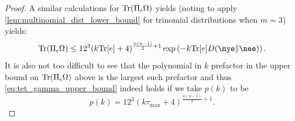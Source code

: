 \documentclass[notitlepage, 10pt]{article}
\begin{document}
\begin{proof}
    A similar calculations for $\operatorname{Tr}(\Pi_{\epsilon} \Omega)$ yields (noting to apply \cref{lem:multinomial_dist_lower_bound} for trinomial distributions when $m=3$) yields:
    \begin{equation}
        \Tr(\Pi_{\ye} \Omega) \leq 12^{3}(k{\tee}+4)^{\frac{n(n-1)}{2}+1}\exp\left(-k{\tee}\kl{\nye}{\nee}\right).
    \end{equation}
    It is also not too difficult to see that the polynomial in $k$ prefactor in the upper bound on $\operatorname{Tr}(\Pi_{\epsilon} \Omega)$ above is the largest such prefactor and thus \cref{eq:tet_gamma_upper_bound} indeed holds if we take $p(k)$ to be
    \begin{equation}
        \label{eq:p_of_k}
        p(k) = 12^{3}(k\tau_{\max}+4)^{\frac{n(n-1)}{2}+1}.
    \end{equation}
\end{proof}
\end{document}
